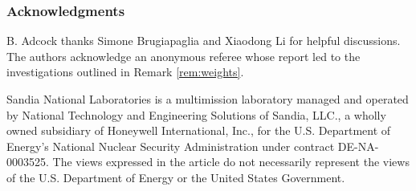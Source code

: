 \documentclass[10.5pt]{article}
\begin{document}
%




\subsubsection*{Acknowledgments}
B. Adcock thanks Simone Brugiapaglia and Xiaodong Li for helpful discussions.  The authors acknowledge an anonymous referee whose report led to the investigations outlined in Remark \ref{rem:weights}.%

Sandia National Laboratories is a multimission laboratory managed and
operated by National Technology and Engineering Solutions of Sandia, LLC., a
wholly owned subsidiary of Honeywell International, Inc., for the
U.S. Department of Energy's National Nuclear Security Administration
under contract DE-NA-0003525. The views expressed in the article do not necessarily represent the views of the U.S. Department of Energy or the United States Government.



\end{document}

